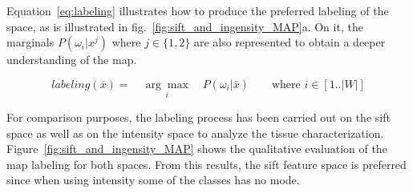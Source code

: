 \documentclass[a4paper, 10pt, conference]{llncs}      %
\begin{document}
Equation~\ref{eq:labeling} illustrates how to produce the preferred labeling of the space, as is illustrated in fig.~\ref{fig:sift_and_ingensity_MAP}a. On it, the marginals $P(\omega_i|x^j)$ where $j\in \{1,2\}$ are also represented to obtain a deeper understanding of the \ac{map}.

\begin{equation}
labeling(\bar{x}) = \quad\underset{i}{\arg\max}\quad P(\omega_i|\bar{x})
\label{eq:labeling} \qquad \text{where } i \in [1 .. |W|] 
\end{equation}

For comparison purposes, the labeling process has been carried out on the \ac{sift} space as well as on the intensity space to analyze the tissue characterization.
Figure~\ref{fig:sift_and_ingensity_MAP} shows the qualitative evaluation of the \ac{map} labeling for both spaces.
From this results, the \ac{sift} feature space is preferred since when using intensity some of the classes has no mode.

\end{document}
